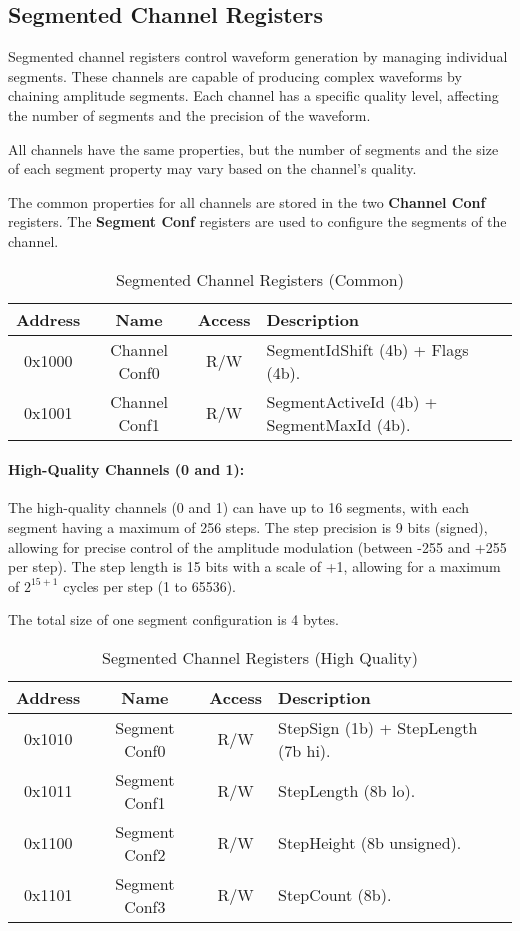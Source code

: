 \subsection{Segmented Channel Registers}
Segmented channel registers control waveform generation by managing individual segments. These channels are capable of producing complex waveforms by chaining amplitude segments.
Each channel has a specific quality level, affecting the number of segments and the precision of the waveform.

All channels have the same properties, but the number of segments and the size of each segment property may vary based on the channel's quality.

The common properties for all channels are stored in the two \textbf{Channel Conf} registers. The \textbf{Segment Conf} registers are used to configure the segments of the channel.

\begin{table}[H]
    \centering
    \begin{tabular}{|c|c|c|l|}
        \hline
        \textbf{Address} & \textbf{Name}        & \textbf{Access} & \textbf{Description} \\
        \hline
        0x1000 & Channel Conf0   & R/W   & SegmentIdShift (4b) + Flags (4b). \\
        0x1001 & Channel Conf1   & R/W   & SegmentActiveId (4b) + SegmentMaxId (4b). \\
        \hline
    \end{tabular}
    \caption{Segmented Channel Registers (Common)}
\end{table}

\paragraph{High-Quality Channels (0 and 1):}
The high-quality channels (0 and 1) can have up to 16 segments, with each segment having a maximum of 256 steps.
The step precision is 9 bits (signed), allowing for precise control of the amplitude modulation (between -255 and +255 per step).
The step length is 15 bits with a scale of +1, allowing for a maximum of $2^{15+1}$ cycles per step (1 to 65536).

The total size of one segment configuration is 4 bytes.

\begin{table}[H]
    \centering
    \begin{tabular}{|c|c|c|l|}
        \hline
        \textbf{Address} & \textbf{Name}        & \textbf{Access} & \textbf{Description} \\
        \hline
        0x1010 & Segment Conf0   & R/W   & StepSign (1b) + StepLength (7b hi). \\
        0x1011 & Segment Conf1   & R/W   & StepLength (8b lo). \\
        0x1100 & Segment Conf2   & R/W   & StepHeight (8b unsigned). \\
        0x1101 & Segment Conf3   & R/W   & StepCount (8b). \\
        \hline
    \end{tabular}
    \caption{Segmented Channel Registers (High Quality)}
\end{table}

